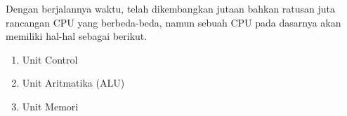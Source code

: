 Dengan berjalannya waktu, telah dikembangkan jutaan bahkan ratusan juta
rancangan CPU yang berbeda-beda, namun sebuah CPU pada dasarnya akan memiliki
hal-hal sebagai berikut.

\begin{enumerate}[label=\alph*.]
  \item Unit Control
  \item Unit Aritmatika (ALU)
  \item Unit Memori
\end{enumerate}
